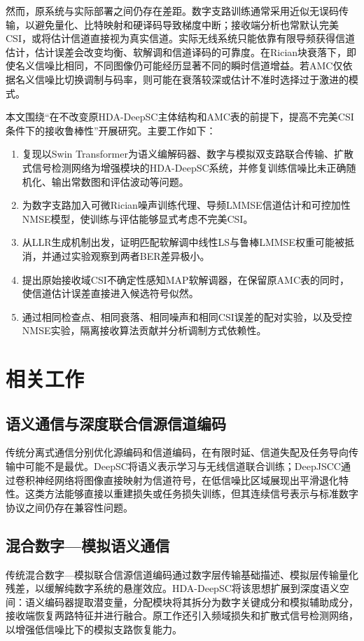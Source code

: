 \documentclass[UTF8,a4paper,11pt]{ctexart}
\newcommand{\HDADeepSC}{HDA-DeepSC}
\newcommand{\CSI}{CSI}
\newcommand{\AMC}{AMC}
\newcommand{\BER}{BER}
\newcommand{\NMSE}{NMSE}
\newcommand{\LLR}{LLR}
\begin{document}
然而，原系统与实际部署之间仍存在差距。数字支路训练通常采用近似无误码传输，以避免量化、比特映射和硬译码导致梯度中断；接收端分析也常默认完美\CSI{}，或将估计信道直接视为真实信道。实际无线系统只能依靠有限导频获得信道估计，估计误差会改变均衡、软解调和信道译码的可靠度。在Rician块衰落下，即使名义信噪比相同，不同图像仍可能经历显著不同的瞬时信道增益。若\AMC{}仅依据名义信噪比切换调制与码率，则可能在衰落较深或估计不准时选择过于激进的模式。

本文围绕“在不改变原\HDADeepSC{}主体结构和\AMC{}表的前提下，提高不完美\CSI{}条件下的接收鲁棒性”开展研究。主要工作如下：
\begin{enumerate}[label=\arabic*)]
  \item 复现以Swin Transformer\cite{liu2021swin}为语义编解码器、数字与模拟双支路联合传输、扩散式信号检测网络为增强模块的\HDADeepSC{}系统，并修复训练信噪比未正确随机化、输出常数图和评估波动等问题。
  \item 为数字支路加入可微Rician噪声训练代理、导频LMMSE信道估计和可控加性\NMSE{}模型，使训练与评估能够显式考虑不完美\CSI{}。
  \item 从\LLR{}生成机制出发，证明匹配软解调中线性LS与鲁棒LMMSE权重可能被抵消，并通过实验观察到两者\BER{}差异极小。
  \item 提出原始接收域\CSI{}不确定性感知MAP软解调器，在保留原\AMC{}表的同时，使信道估计误差直接进入候选符号似然。
  \item 通过相同检查点、相同衰落、相同噪声和相同\CSI{}误差的配对实验，以及受控\NMSE{}实验，隔离接收算法贡献并分析调制方式依赖性。
\end{enumerate}

\section{相关工作}
\subsection{语义通信与深度联合信源信道编码}
传统分离式通信分别优化源编码和信道编码，在有限时延、信道失配及任务导向传输中可能不是最优。DeepSC将语义表示学习与无线信道联合训练\cite{xie2021deepsc}；DeepJSCC通过卷积神经网络将图像直接映射为信道符号，在低信噪比区域展现出平滑退化特性\cite{bourtsoulatze2019deepjscc}。这类方法能够直接以重建损失或任务损失训练，但其连续信号表示与标准数字协议之间仍存在兼容性问题。

\subsection{混合数字—模拟语义通信}
传统混合数字—模拟联合信源信道编码通过数字层传输基础描述、模拟层传输量化残差，以缓解纯数字系统的悬崖效应。\HDADeepSC{}将该思想扩展到深度语义空间：语义编码器提取潜变量，分配模块将其拆分为数字关键成分和模拟辅助成分，接收端恢复两路特征并进行融合\cite{xie2025hda}。原工作还引入频域损失和扩散式信号检测网络，以增强低信噪比下的模拟支路恢复能力。
\end{document}
